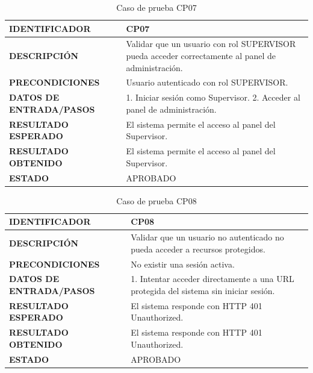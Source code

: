 \begin{table}[H]
\centering
\caption{Caso de prueba CP07}
\begin{tabular}{|p{3.5cm}|p{10.3cm}|}
\hline
\textbf{IDENTIFICADOR} & CP07 \\
\hline
\textbf{DESCRIPCIÓN} & Validar que un usuario con rol SUPERVISOR pueda acceder correctamente al panel de administración. \\
\hline
\textbf{PRECONDICIONES} & Usuario autenticado con rol SUPERVISOR. \\
\hline
\textbf{DATOS DE ENTRADA/PASOS} & 1. Iniciar sesión como Supervisor. 2. Acceder al panel de administración. \\
\hline
\textbf{RESULTADO ESPERADO} & El sistema permite el acceso al panel del Supervisor. \\
\hline
\textbf{RESULTADO OBTENIDO} & El sistema permite el acceso al panel del Supervisor. \\
\hline
\textbf{ESTADO} & APROBADO \\
\hline
\end{tabular}
\end{table}

\begin{table}[H]
\centering
\caption{Caso de prueba CP08}
\begin{tabular}{|p{3.5cm}|p{10.3cm}|}
\hline
\textbf{IDENTIFICADOR} & CP08 \\
\hline
\textbf{DESCRIPCIÓN} & Validar que un usuario no autenticado no pueda acceder a recursos protegidos. \\
\hline
\textbf{PRECONDICIONES} & No existir una sesión activa. \\
\hline
\textbf{DATOS DE ENTRADA/PASOS} & 1. Intentar acceder directamente a una URL protegida del sistema sin iniciar sesión. \\
\hline
\textbf{RESULTADO ESPERADO} & El sistema responde con HTTP 401 Unauthorized. \\
\hline
\textbf{RESULTADO OBTENIDO} & El sistema responde con HTTP 401 Unauthorized. \\
\hline
\textbf{ESTADO} & APROBADO \\
\hline
\end{tabular}
\end{table}

